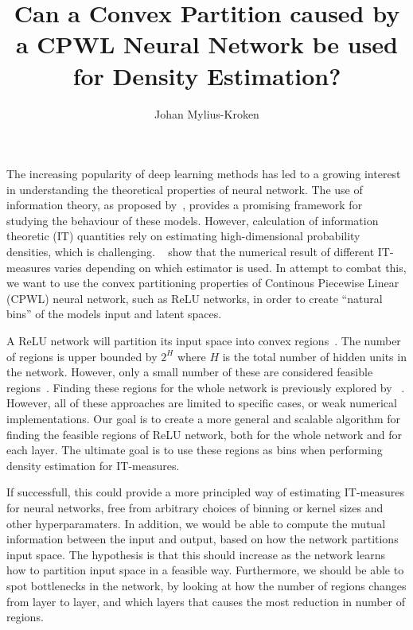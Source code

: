 \documentclass{article} %
\title{Can a Convex Partition caused by a CPWL Neural Network be used for Density Estimation?}
\author{Johan Mylius-Kroken}
\begin{document}
\maketitle

The increasing popularity of deep learning methods has led to a growing interest in understanding the theoretical properties of neural network. The use of information theory, as proposed by~\cite{tishbyDeepLearningInformation2015a,shwartz-zivOpeningBlackBox2017}, provides a promising framework for studying the behaviour of these models. However, calculation of information theoretic (IT) quantities rely on estimating high-dimensional probability densities, which is challenging. ~\cite{geigerInformationPlaneAnalyses2022} show that the numerical result of different IT-measures varies depending on which estimator is used. In attempt to combat this, we want to use the convex partitioning properties of Continous Piecewise Linear (CPWL) neural network, such as ReLU networks, in order to create ``natural bins'' of the models input and latent spaces. 

A ReLU network will partition its input space into convex regions~\citep{serraBoundingCountingLinear2018,haninComplexityLinearRegions2019}. The number of regions is upper bounded by $2^H$ where $H$ is the total number of hidden units in the network. However, only a small number of these are considered feasible regions~\cite{haninDeepReLUNetworks2019}. Finding these regions for the whole network is previously explored by ~\cite{liuReLUNeuralNetworks2023,sattelbergLocallyLinearAttributes2023,humayunSplineCamExactVisualization2024}. However, all of these approaches are limited to specific cases, or weak numerical implementations. Our goal is to create a more general and scalable algorithm for finding the feasible regions of ReLU network, both for the whole network and for each layer. The ultimate goal is to use these regions as bins when performing density estimation for IT-measures. 

If successfull, this could provide a more principled way of estimating IT-measures for neural networks, free from arbitrary choices of binning or kernel sizes and other hyperparamaters. In addition, we would be able to compute the mutual information between the input and output, based on how the network partitions input space. The hypothesis is that this should increase as the network learns how to partition input space in a feasible way. Furthermore, we should be able to spot bottlenecks in the network, by looking at how the number of regions changes from layer to layer, and which layers that causes the most reduction in number of regions.
\end{document}
